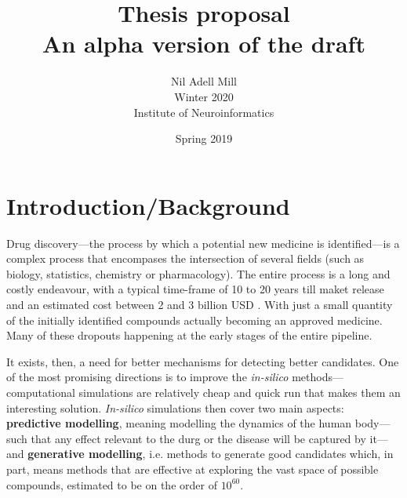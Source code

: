 \documentclass{article}
\begin{document}
\title{\Large Thesis proposal \\ \small An alpha version of the draft}
\author{Nil Adell Mill \\
        Winter 2020 \\
        Institute of Neuroinformatics \\}
\date{Spring 2019}

\maketitle

    \section*{Introduction/Background}  

Drug discovery—the process by which a potential new medicine is identified---is a
 complex process that encompases the intersection of several fields (such as biology,
 statistics, chemistry or pharmacology). The entire process is a long and costly
 endeavour, with a typical time-frame of 10 to 20 years till maket release and an
 estimated cost between 2 and 3 billion USD \cite{Schneider2019, Scannell2012}. With
 just a small quantity of the initially identified compounds actually becoming an
 approved medicine. Many of these dropouts happening at the early stages of the entire
 pipeline.

It exists, then, a need for better mechanisms for detecting better candidates. One of
 the most promising directions is to improve the \emph{in-silico}
 methods---computational simulations are relatively cheap and quick run that makes them
 an interesting solution. \emph{In-silico} simulations then cover two main aspects:
 \textbf{predictive modelling}, meaning modelling the dynamics of the human body---such
 that any effect relevant to the durg or the disease will be captured by it---and
 \textbf{generative modelling}, i.e. methods to generate good candidates which, in part,
 means methods that are effective at exploring the vast space of possible compounds,
 estimated to be on the order of $10^{60}$\cite{Reymond2012}.



\end{document}
